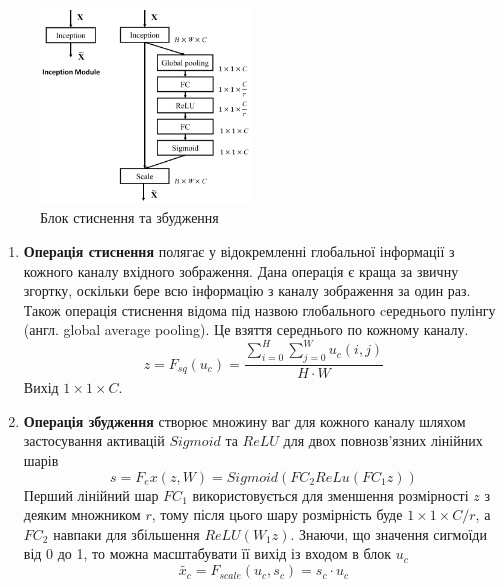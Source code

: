 \begin{figure}[H]
    \centering
    \includegraphics[width=0.5\textwidth]{images/cnn_senet_block}
    \caption{Блок стиснення та збудження      \cite{squeeze_and_excitation_website}
        \label{fig:cnn:senet_block}
    }
\end{figure}

\begin{enumerate}
    \item \textbf{Операція стиснення} полягає у відокремленні глобальної інформації з кожного каналу
          вхідного зображення. Дана операція є краща за звичну згортку, оскільки бере всю інформацію
          з каналу зображення за один раз. Також операція стиснення відома під назвою глобального
          cереднього пулінгу  (англ. global average pooling). Це взяття середнього по кожному каналу.
          \begin{equation}
              z = F_{sq}(u_c) = \frac{\sum_{i=0}^{H} \sum_{j=0}^{W} u_c(i,j)}{H·W}
          \end{equation}
          Вихід $1 \times 1 \times C$.
    \item \textbf{Операція збудження} створює множину ваг для кожного каналу шляхом застосування
          активацій $Sigmoid$ та $ReLU$ для двох повнозв'язних лінійних шарів
          \begin{equation}
              s = F_ex(z,W) = Sigmoid(FC_2ReLu(FC_1z))
          \end{equation}
          Перший лінійний шар $FC_1$ використовується для зменшення розмірності $z$ з деяким
          множником $r$, тому після цього шару розмірність буде $1 \times 1 \times C/r$, а $FC_2$ навпаки
          для збільшення $ReLU(W_1z)$. Знаючи, що значення сигмоїди від 0 до 1, то можна
          масштабувати її вихід із входом в блок $u_c$
          \begin{equation}
              \widetilde{x_c} = F_{scale}(u_c,s_c) = s_c·u_c
          \end{equation}
\end{enumerate}

